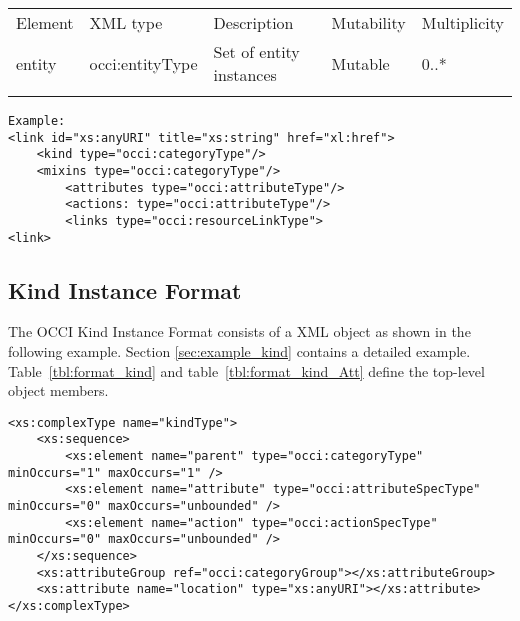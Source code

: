 \documentclass[10pt,a4paper]{article}
\begin{document}
 {
    \begin{tabularx}{\textwidth}{llXll}
    \toprule
    Element & XML type & Description & Mutability & Multiplicity \\
    \colrule
    entity & occi:entityType & Set of entity instances & Mutable & 0..* \\
    \botrule
    \end{tabularx}
}
\FloatBarrier

\begin{lstlisting}
Example:
<link id="xs:anyURI" title="xs:string" href="xl:href">
	<kind type="occi:categoryType"/>
	<mixins type="occi:categoryType"/>
        <attributes type="occi:attributeType"/>
        <actions: type="occi:attributeType"/>
        <links type="occi:resourceLinkType">
<link>
\end{lstlisting}

\subsection{Kind Instance Format}
\label{sec:format_kind}

The OCCI Kind Instance Format consists of a XML object as shown in the
following example. Section \ref{sec:example_kind} contains a detailed example.
Table~\ref{tbl:format_kind} and table~\ref{tbl:format_kind_Att} define the top-level object members.

\begin{lstlisting}
<xs:complexType name="kindType">
	<xs:sequence>
		<xs:element name="parent" type="occi:categoryType" minOccurs="1" maxOccurs="1" />
		<xs:element name="attribute" type="occi:attributeSpecType" minOccurs="0" maxOccurs="unbounded" />
		<xs:element name="action" type="occi:actionSpecType" minOccurs="0" maxOccurs="unbounded" />
	</xs:sequence>
	<xs:attributeGroup ref="occi:categoryGroup"></xs:attributeGroup>
	<xs:attribute name="location" type="xs:anyURI"></xs:attribute>
</xs:complexType>
\end{lstlisting}
\end{document}
